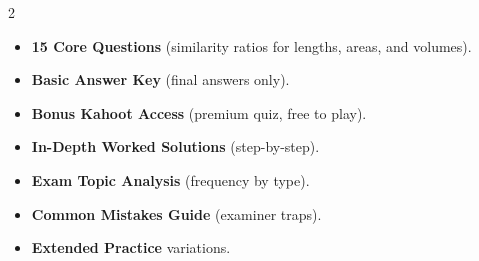 \documentclass[11pt,a4paper]{article}
\newcommand{\FullReleaseDate}{April 30, 2026}
\begin{document}
\vspace{8pt}

\begin{multicols}{2}
  \begin{tcolorbox}[card, title=\sffamily\bfseries\textcolor{white}{\faHandPointDown\ TODAY (Simplified Version)}, colbacktitle=mainblue, boxed title style={sharp corners, boxrule=0pt}]
    \begin{itemize}[leftmargin=1.2em, itemsep=2pt]
      \item \small \textbf{15 Core Questions} (similarity ratios for lengths, areas, and volumes).
      \item \small \textbf{Basic Answer Key} (final answers only).
      \item \small \textbf{Bonus Kahoot Access} (premium quiz, free to play).
    \end{itemize}
  \end{tcolorbox}

  \columnbreak

  \begin{tcolorbox}[card, title=\sffamily\bfseries\textcolor{white}{\faRocket\ ON \FullReleaseDate\ (Full Upgrade)}, colbacktitle=mainblue, boxed title style={sharp corners, boxrule=0pt}]
    \begin{itemize}[leftmargin=1.2em, itemsep=2pt]
      \item \small \textbf{In-Depth Worked Solutions} (step-by-step).
      \item \small \textbf{Exam Topic Analysis} (frequency by type).
      \item \small \textbf{Common Mistakes Guide} (examiner traps).
      \item \small \textbf{Extended Practice} variations.
    \end{itemize}
  \end{tcolorbox}
\end{multicols}
\end{document}
